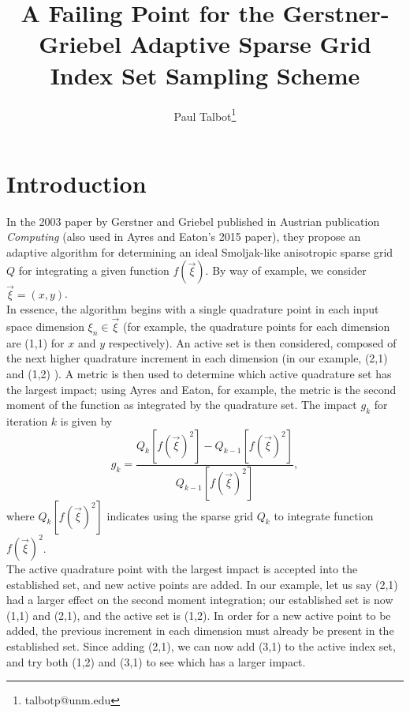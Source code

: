 \documentclass[11pt]{article}
\begin{document}
\title{A Failing Point for the Gerstner-Griebel Adaptive Sparse Grid Index Set Sampling Scheme}

\author[]{Paul Talbot\thanks{talbotp@unm.edu}}
\date{}
\renewcommand\Authands{ and }
\maketitle
\section{Introduction}
In the 2003 paper by Gerstner and Griebel published in Austrian publication \emph{Computing} (also used in Ayres and Eaton's 2015 paper), they propose an adaptive algorithm for determining an ideal Smoljak-like anisotropic sparse grid $Q$ for integrating a given function $f(\vec\xi)$.  By way of example, we consider $\vec\xi=(x,y)$.\\

In essence, the algorithm begins with a single quadrature point in each input space dimension $\xi_n\in\vec\xi$ (for example, the quadrature points for each dimension are (1,1) for $x$ and $y$ respectively).  An active set is then considered, composed of the next higher quadrature increment in each dimension (in our example, (2,1) and (1,2) ).  A metric is then used to determine which active quadrature set has the largest impact; using Ayres and Eaton, for example, the metric is the second moment of the function as integrated by the quadrature set.  The impact $g_k$ for iteration $k$ is given by
\begin{equation}
g_k = \frac{Q_k[f(\vec\xi)^2] - Q_{k-1}[f(\vec\xi)^2]}{Q_{k-1}[f(\vec\xi)^2]},
\end{equation}
where $Q_k[f(\vec\xi)^2]$ indicates using the sparse grid $Q_k$ to integrate function $f(\vec\xi)^2$.
\\

The active quadrature point with the largest impact is accepted into the established set, and new active points are added.   In our example, let us say (2,1) had a larger effect on the second moment integration; our established set is now (1,1) and (2,1), and the active set is (1,2). In order for a new active point to be added, the previous increment in each dimension must already be present in the established set. Since adding (2,1), we can now add (3,1) to the active index set, and try both (1,2) and (3,1) to see which has a larger impact.\\
\end{document}
